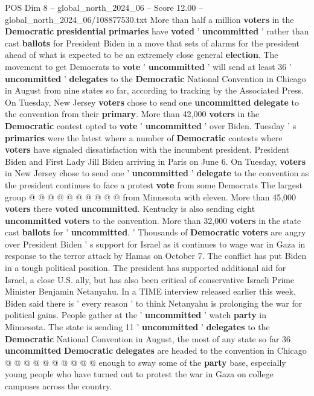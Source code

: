 \begin{textsample}{POS Dim 8 – global\_north\_2024\_06 – Score 12.00 – global\_north\_2024\_06/108877530.txt}  \label{ex:f8_pos_063}
More than half a million \textbf{voters} in the \textbf{Democratic} \textbf{presidential} \textbf{primaries} have \textbf{voted} ' \textbf{uncommitted} ' rather than cast \textbf{ballots} for President Biden in a move that sets of alarms for the president ahead of what is expected to be an extremely close general \textbf{election}.
The movement to get Democrats to \textbf{vote} ' \textbf{uncommitted} ' will send at least 36 ' \textbf{uncommitted} ' \textbf{delegates} to the \textbf{Democratic} National Convention in Chicago in August from nine states so far, according to tracking by the Associated Press.
On Tuesday, New Jersey \textbf{voters} chose to send one \textbf{uncommitted} \textbf{delegate} to the convention from their \textbf{primary}.
More than 42,000 \textbf{voters} in the \textbf{Democratic} contest opted to \textbf{vote} ' \textbf{uncommitted} ' over Biden.
Tuesday ' s \textbf{primaries} were the latest where a number of \textbf{Democratic} contests where \textbf{voters} have signaled dissatisfaction with the incumbent president.
President Biden and First Lady Jill Biden arriving in Paris on June 6.
On Tuesday, \textbf{voters} in New Jersey chose to send one ' \textbf{uncommitted} ' \textbf{delegate} to the convention as the president continues to face a protest \textbf{vote} from some Democrats The largest group @ @ @ @ @ @ @ @ @ @ from Minnesota with eleven.
More than 45,000 \textbf{voters} there \textbf{voted} \textbf{uncommitted}.
Kentucky is also sending eight \textbf{uncommitted} \textbf{voters} to the convention.
More than 32,000 \textbf{voters} in the state cast \textbf{ballots} for ' \textbf{uncommitted}. ' Thousands of \textbf{Democratic} \textbf{voters} are angry over President Biden ' s support for Israel as it continues to wage war in Gaza in response to the terror attack by Hamas on October 7.
The conflict has put Biden in a tough political position.
The president has supported additional aid for Israel, a close U.S. ally, but has also been critical of conservative Israeli Prime Minister Benjamin Netanyahu.
In a TIME interview released earlier this week, Biden said there is ' every reason ' to think Netanyahu is prolonging the war for political gains.
People gather at the ' \textbf{uncommitted} ' watch \textbf{party} in Minnesota.
The state is sending 11 ' \textbf{uncommitted} ' \textbf{delegates} to the \textbf{Democratic} National Convention in August, the most of any state so far 36 \textbf{uncommitted} \textbf{Democratic} \textbf{delegates} are headed to the convention in Chicago @ @ @ @ @ @ @ @ @ @ enough to sway some of the \textbf{party} base, especially young people who have turned out to protest the war in Gaza on college campuses across the country.

\end{textsample}
